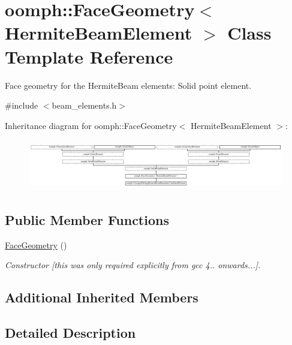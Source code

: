 \hypertarget{classoomph_1_1FaceGeometry_3_01HermiteBeamElement_01_4}{}\section{oomph\+:\+:Face\+Geometry$<$ Hermite\+Beam\+Element $>$ Class Template Reference}
\label{classoomph_1_1FaceGeometry_3_01HermiteBeamElement_01_4}


Face geometry for the Hermite\+Beam elements\+: Solid point element.  




{\ttfamily \#include $<$beam\+\_\+elements.\+h$>$}

Inheritance diagram for oomph\+:\+:Face\+Geometry$<$ Hermite\+Beam\+Element $>$\+:\begin{figure}[H]
\begin{center}
\leavevmode
\includegraphics[height=2.234043cm]{classoomph_1_1FaceGeometry_3_01HermiteBeamElement_01_4}
\end{center}
\end{figure}
\subsection*{Public Member Functions}
\begin{DoxyCompactItemize}
\item 
\hyperlink{classoomph_1_1FaceGeometry_3_01HermiteBeamElement_01_4_a26c1c7ad8826478f991d3e5ef11036da}{Face\+Geometry} ()
\begin{DoxyCompactList}\small\item\em Constructor \mbox{[}this was only required explicitly from gcc 4.. onwards...\mbox{]}. \end{DoxyCompactList}\end{DoxyCompactItemize}
\subsection*{Additional Inherited Members}


\subsection{Detailed Description}
